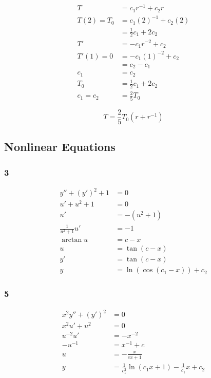 \documentclass{article}
\begin{document}
\begin{align*}
  T          & = c_1 r^{-1} + c_2 r      \\
  T(2) = T_0 & = c_1 (2)^{-1} + c_2 (2)  \\
             & = \frac{1}{2} c_1 + 2 c_2 \\
  T'         & = -c_1 r^{-2} + c_2       \\
  T'(1) = 0  & = -c_1 (1)^{-2} + c_2     \\
             & = c_2 - c_1               \\
  c_1        & = c_2                     \\
  T_0        & = \frac{1}{2} c_1 + 2 c_2 \\
  c_1 = c_2  & = \frac{2}{5} T_0
\end{align*}

\[T = \frac{2}{5} T_0 (r + r^{-1})\]

\subsection{Nonlinear Equations}

\subsubsection{3}

\begin{align*}
  y'' + (y')^2 + 1     & = 0                          \\
  u' + u^2 + 1         & = 0                          \\
  u'                   & = -(u^2 + 1)                 \\
  \frac{1}{u^2 + 1} u' & = -1                         \\
  \arctan u            & = c - x                      \\
  u                    & = \tan (c - x)               \\
  y'                   & = \tan (c - x)               \\
  y                    & = \ln (\cos (c_1 - x)) + c_2
\end{align*}

\subsubsection{5}

\begin{align*}
  x^2 y'' + (y')^2 & = 0                                                       \\
  x^2 u' + u^2     & = 0                                                       \\
  u^{-2} u'        & = -x^{-2}                                                 \\
  -u^{-1}          & = x^{-1} + c                                              \\
  u                & = -\frac{x}{cx + 1}                                       \\
  y                & = \frac{1}{c_1^2} \ln (c_1 x + 1) - \frac{1}{c_1} x + c_2
\end{align*}
\end{document}
